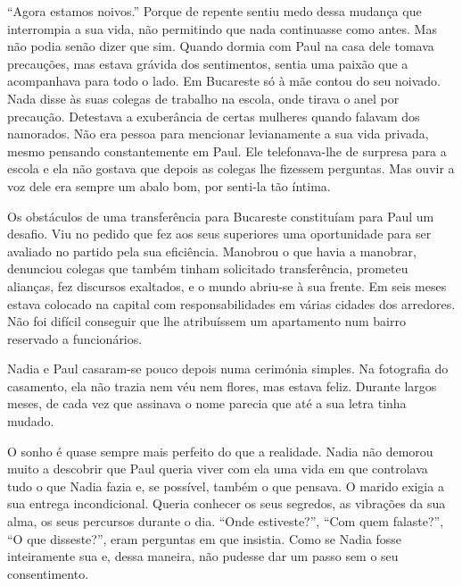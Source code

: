 ``Agora estamos noivos.'' Porque de repente sentiu medo dessa mudança que
interrompia a sua vida, não permitindo que nada continuasse como antes.
Mas não podia senão dizer que sim. Quando dormia com Paul na casa dele
tomava precauções, mas estava grávida dos sentimentos, sentia uma paixão
que a acompanhava para todo o lado. Em Bucareste só à mãe contou do seu
noivado. Nada disse às suas colegas de trabalho na escola, onde tirava o
anel por precaução. Detestava a exuberância de certas mulheres quando
falavam dos namorados. Não era pessoa para mencionar levianamente a sua
vida privada, mesmo pensando constantemente em Paul. Ele telefonava-lhe
de surpresa para a escola e ela não gostava que depois as colegas lhe
fizessem perguntas. Mas ouvir a voz dele era
sempre um abalo bom, por senti-la tão íntima.

Os obstáculos de uma transferência para Bucareste constituíam para Paul
um desafio. Viu no pedido que fez
aos seus superiores uma oportunidade para ser avaliado no partido pela
sua eficiência. Manobrou o que havia a manobrar, denunciou colegas que
também tinham solicitado transferência, prometeu alianças, fez
discursos exaltados, e o mundo abriu-se à sua frente. Em seis meses
estava colocado na capital com responsabilidades em várias cidades dos
arredores. Não foi difícil conseguir que lhe atribuíssem um apartamento
num bairro reservado a funcionários.

Nadia e Paul casaram-se pouco depois numa cerimónia simples. Na
fotografia do casamento, ela não trazia nem véu nem flores, mas estava
feliz. Durante largos meses, de cada vez que assinava o nome parecia que
até a sua letra tinha mudado.

O sonho é quase sempre mais perfeito do que a realidade. Nadia não
demorou muito a descobrir que Paul queria viver com ela uma vida em que
controlava tudo o que Nadia fazia e, se possível, também o que pensava.
O marido exigia a sua entrega incondicional. Queria conhecer os seus
segredos, as vibrações da sua alma, os seus percursos durante o dia.
``Onde estiveste?'', ``Com quem falaste?'', ``O que disseste?'', eram
perguntas em que insistia. Como se Nadia fosse inteiramente sua e,
dessa maneira, não pudesse dar um passo sem o seu consentimento.

